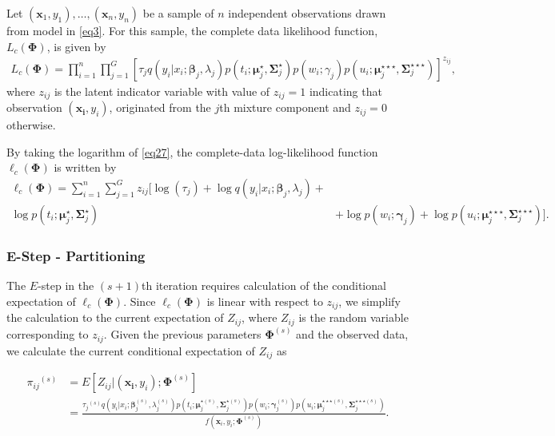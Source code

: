 \documentclass[11pt,letterpaper]{article}
\numberwithin{equation}{section}
\numberwithin{equation}{section}
\numberwithin{equation}{section}
\begin{document}
Let $(\bm x_1, y_1),\ldots, (\bm x_n, y_n)$ be a sample of $n$ independent observations drawn from model in \eqref{eq3}.
For this sample, the complete data likelihood function, $L_c(\bm\Phi)$, is given by
\begin{align}
L_c(\bm\Phi)=\prod_{i=1}^{n}\prod_{j=1}^{G}\left[{\tau_j}q(y_i|x_i; \bm \beta_j, \lambda_{j})p(t_i; \bm\mu_j^{\star}, \bm\Sigma_j^{\star}) p(w_i; \gamma_j)p(u_i; \bm{\mu}_j^{\star\star\star},\bm{\Sigma}_j^{\star\star\star}) \right]^{z_{ij}},
\label{eq27}
\end{align}
where $z_{ij}$ is the latent indicator variable with value of $z_{ij}=1$ indicating that observation $(\bm{x_i}, y_i)$, originated from the $j$th mixture component and $z_{ij}=0$ otherwise.

By taking the logarithm of \eqref{eq27}, the complete-data log-likelihood function $\ell_c(\bm\Phi)$ is written by
\begin{equation}\begin{split}
\ell_c(\bm\Phi)= \sum_{i=1}^{n}\sum_{j=1}^{G}{z_{ij}}\big[\log(\tau_{j}) + \log{q}(y_i|x_i; \bm{\beta}_j,\lambda_j)+& \\ \log p(t_i; \bm{\mu}_j^{\star}, \bm{\Sigma}_j^{\star}) & + \log p(w_i; \bm{\gamma}_j) +\log {p}(u_i; \bm{\mu}_j^{\star\star\star},\bm{\Sigma}_j^{\star\star\star}) \big].
\label{CompleteLiklihood}
\end{split}\end{equation}

\subsubsection{E-Step - Partitioning}
The $E$-step in the $(s+1)$th iteration requires calculation of the conditional expectation of $\ell_c(\bm\Phi)$. Since  $\ell_c(\bm\Phi)$ is linear with respect to  $z_{ij}$, we simplify the calculation to the current expectation of $Z_{ij}$, where $Z_{ij}$ is the random variable corresponding to $z_{ij}$. Given the previous parameters $\bm\Phi^{(s)}$ and the observed data,  we calculate the current conditional expectation of $Z_{ij}$ as

\begin{equation*}\begin{split}
    {\pi_{ij}}^{(s)} &= {E}[Z_{ij} |(\bm{x_i}, y_i); \bm{\Phi}^{(s)}]\\
     &= \frac{{\tau_j}^{(s)}q(y_i|x_i; \bm \beta_j^{(s)}, \lambda^{(s)}_{j})p(t_i; \bm\mu_j^{{\star}(s)}, \bm\Sigma_j^{{\star}(s)}) p(w_i; \bm \gamma_j^{(s)})p(u_i; \bm{\mu}_j^{\star\star\star (s)},\bm{\Sigma}_j^{\star\star\star (s)})}{f(\bm{x}_i, y_i; \bm{\Phi}^{(s)})
\label{eq29}                       }.
\end{split}\end{equation*}
\end{document}
